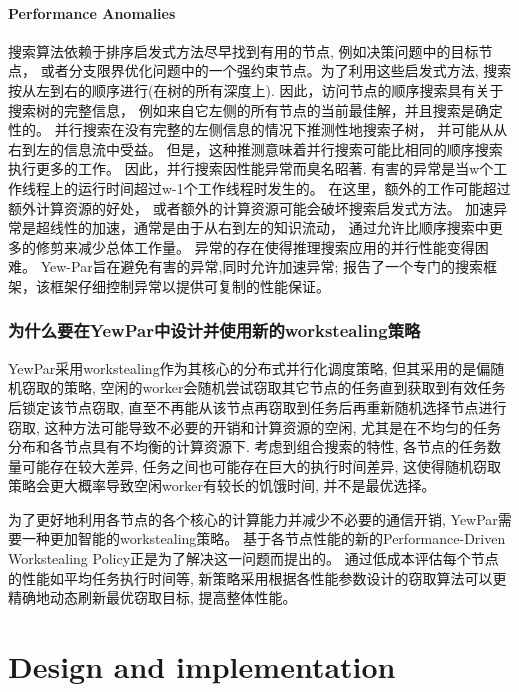 \documentclass{mproj}
\begin{document}
\subsubsection{Performance Anomalies}
\label{sec:performance_anomalies}
搜索算法依赖于排序启发式方法尽早找到有用的节点,
例如决策问题中的目标节点，
或者分支限界优化问题中的一个强约束节点。为了利用这些启发式方法,
搜索按从左到右的顺序进行(在树的所有深度上).
因此，访问节点的顺序搜索具有关于搜索树的完整信息，
例如来自它左侧的所有节点的当前最佳解，并且搜索是确定性的。
并行搜索在没有完整的左侧信息的情况下推测性地搜索子树，
并可能从从右到左的信息流中受益。
但是，这种推测意味着并行搜索可能比相同的顺序搜索执行更多的工作。
因此，并行搜索因性能异常而臭名昭著\cite{10.1007/3-540-60321-2_29}.
有害的异常是当w个工作线程上的运行时间超过w-1个工作线程时发生的。
在这里，额外的工作可能超过额外计算资源的好处，
或者额外的计算资源可能会破坏搜索启发式方法。
加速异常是超线性的加速，通常是由于从右到左的知识流动，
通过允许比顺序搜索中更多的修剪来减少总体工作量。
异常的存在使得推理搜索应用的并行性能变得困难。
Yew-Par旨在避免有害的异常,同时允许加速异常;
\cite{ARCHIBALD201892}报告了一个专门的搜索框架，该框架仔细控制异常以提供可复制的性能保证。

\subsection{为什么要在YewPar中设计并使用新的workstealing策略}

YewPar采用workstealing作为其核心的分布式并行化调度策略,
但其采用的是偏随机窃取的策略\cite{archibald2019yewpar},
空闲的worker会随机尝试窃取其它节点的任务直到获取到有效任务后锁定该节点窃取,
直至不再能从该节点再窃取到任务后再重新随机选择节点进行窃取,
这种方法可能导致不必要的开销和计算资源的空闲,
尤其是在不均匀的任务分布和各节点具有不均衡的计算资源下.
考虑到组合搜索的特性,
各节点的任务数量可能存在较大差异,
任务之间也可能存在巨大的执行时间差异,
这使得随机窃取策略会更大概率导致空闲worker有较长的饥饿时间,
并不是最优选择。

为了更好地利用各节点的各个核心的计算能力并减少不必要的通信开销,
YewPar需要一种更加智能的workstealing策略。
基于各节点性能的新的Performance-Driven Workstealing Policy正是为了解决这一问题而提出的。
通过低成本评估每个节点的性能如平均任务执行时间等,
新策略采用根据各性能参数设计的窃取算法可以更精确地动态刷新最优窃取目标,
提高整体性能。



\chapter{Design and implementation}\label{design}
\end{document}
